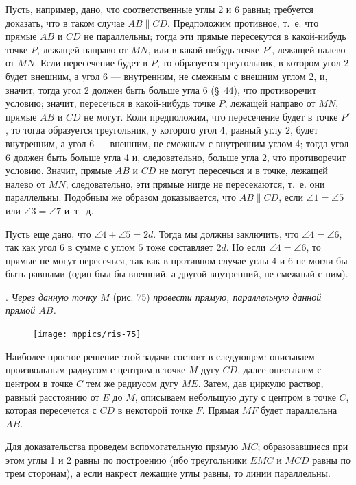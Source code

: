 \documentclass[oneside]{book}
\begin{document}
Пусть, например, дано, что соответственные углы 2 и 6 равны;
требуется доказать, что в таком случае $AB \parallel CD$.
Предположим противное, т.~е. что прямые $AB$ и $CD$ не параллельны;
тогда эти прямые пересекутся в какой-нибудь точке $P$, лежащей направо от $MN$, или в какой-нибудь точке $P'$, лежащей налево от $MN$.
Если пересечение будет в $P$, то образуется треугольник, в котором угол 2 будет внешним, а угол 6 — внутренним, не смежным с внешним углом 2, и, значит, тогда угол 2 должен быть больше угла 6 (§~44), что противоречит условию;
значит, пересечься в какой-нибудь точке $P$, лежащей направо от $MN$, прямые $AB$ и $CD$ не могут.
Коли предположим, что пересечение будет в точке $P'$, то тогда образуется треугольник, у которого угол 4, равный углу 2, будет внутренним, а угол 6 — внешним, не смежным с внутренним углом 4;
тогда угол 6 должен быть больше угла 4 и, следовательно, больше угла 2, что противоречит условию.
Значит, прямые $AB$ и $CD$ не могут пересечься и в точке, лежащей налево от $MN$;
следовательно, эти прямые нигде не пересекаются, т.~е. они параллельны.
Подобным же образом доказывается, что $AB \parallel CD$, если $\angle 1 = \angle 5$ или $\angle 3 = \angle 7$ и~т.~д.

Пусть еще дано, что $\angle 4 + \angle 5 = 2d$.
Тогда мы должны заключить, что $\angle 4 = \angle 6$, так как угол $6$ в сумме с углом $5$ тоже составляет $2d$.
Но если $\angle 4 = \angle 6$, то прямые не могут пересечься, так как в противном случае углы 4 и 6 не могли бы быть равными (один был бы внешний, а другой внутренний, не смежный с ним).

.
\emph{Через данную точку $M$} (рис. 75) \emph{провести прямую, параллельную данной прямой $AB$.}

\begin{figure}
\centering
\texttt{[image: mppics/ris-75]}
\caption{}
\end{figure}


Наиболее простое решение этой задачи состоит в следующем:
описываем произвольным радиусом с центром в точке $M$ дугу $CD$, далее описываем с центром в точке $C$ тем же радиусом дугу $ME$.
Затем, дав циркулю раствор, равный расстоянию от $E$ до $M$, описываем небольшую дугу с центром в точке $C$, которая пересечется с $CD$ в некоторой точке $F$.
Прямая $MF$ будет параллельна $AB$.

Для доказательства проведем вспомогательную прямую $MC$;
образовавшиеся при этом углы 1 и 2 равны по построению (ибо треугольники $EMC$ и $MCD$ равны по трем сторонам), а если накрест лежащие углы равны, то линии параллельны.
\end{document}
